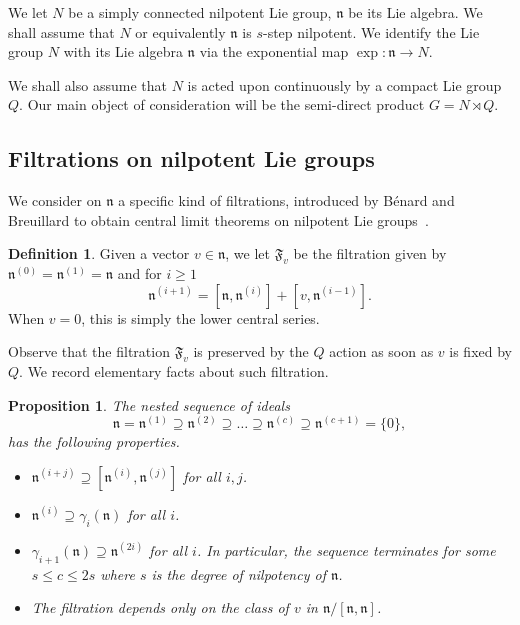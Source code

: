 \documentclass[11pt,leqno]{article}
\theoremstyle{plain}
\newtheorem{proposition}[theorem]{Proposition}
\theoremstyle{definition}
\newtheorem{definition}[theorem]{Definition}
\theoremstyle{remark}
\numberwithin{equation}{section}
\begin{document}
We let $N$ be a simply connected nilpotent Lie group, $\mathfrak{n}$
be its Lie algebra. We shall assume that $N$ or equivalently $\mathfrak{n}$
is $s$-step nilpotent.  We identify the Lie group $N$ with its Lie algebra
$\mathfrak{n}$ via the exponential map $\exp:\mathfrak{n}\to N$. 

We shall also assume that $N$ is acted upon continuously by a compact Lie group $Q$.
Our main object of consideration will be the semi-direct product $G=N\rtimes Q$. 


\subsection{Filtrations on nilpotent Lie groups}

We consider on $\mathfrak{n}$ a specific kind of filtrations, introduced by Bénard and Breuillard to obtain central limit theorems on nilpotent Lie groups~\cite{BeBr23}.

\begin{definition}\label{not:Fv}
Given a vector $v \in \mathfrak{n}$, we let $\mathfrak{F}_v$ be the filtration  given by $\mathfrak{n}^{(0)}=\mathfrak{n}^{(1)}=\mathfrak{n}$ and for $i \ge 1$
\[
\mathfrak{n}^{(i+1)}= [\mathfrak{n},\mathfrak{n}^{(i)}]+[v,\mathfrak{n}^{(i-1)}].
\]
When $v=0$, this is simply the lower central series. 
\end{definition}

Observe that the filtration $\mathfrak{F}_v$ is preserved by the $Q$ action as soon as $v$ is fixed by $Q$. We record elementary facts about such filtration.

\begin{proposition}\label{prop:nested} The nested
sequence of ideals 
\[
\mathfrak{n}=\mathfrak{n}^{(1)}\supseteq\mathfrak{n}^{(2)}\supseteq\ldots\supseteq\mathfrak{n}^{(c)}\supseteq\mathfrak{n}^{(c+1)}=\{0\},
\]
has the following properties.
\begin{itemize}
\item $\mathfrak{n}^{(i+j)}\supseteq\left[\mathfrak{n}^{(i)},\mathfrak{n}^{(j)}\right]$ for all $i,j$.
\item  $\mathfrak{n}^{(i)} \supseteq \gamma_i(\mathfrak{n})$ for all $i$.
\item $\gamma_{i+1}(\mathfrak{n})  \supseteq \mathfrak{n}^{(2i)}$ for all $i$. In particular, the sequence terminates for some $s\le c \le 2s$ where $s$ is the degree of nilpotency of $\mathfrak{n}$.
\item The filtration depends only on the class of $v$ in $\mathfrak{n}/[\mathfrak{n},\mathfrak{n}]$.
\end{itemize}
\end{proposition}
\end{document}
